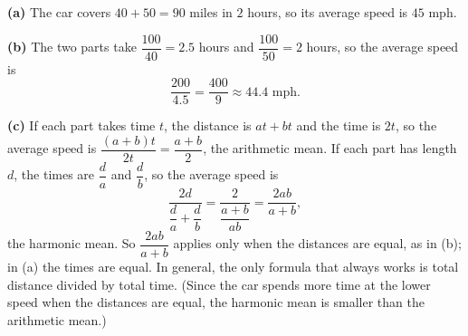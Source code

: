 \textbf{(a)} The car covers $40+50=90$ miles in $2$ hours, so its average speed is $\boxed{45}$ mph.

\textbf{(b)} The two parts take $\dfrac{100}{40}=2.5$ hours and $\dfrac{100}{50}=2$ hours, so the average speed is
\[\dfrac{200}{4.5}=\boxed{\dfrac{400}{9}}\approx44.4\text{ mph}.\]

\textbf{(c)} If each part takes time $t$, the distance is $at+bt$ and the time is $2t$, so the average speed is $\dfrac{(a+b)t}{2t}=\dfrac{a+b}{2}$, the arithmetic mean. If each part has length $d$, the times are $\dfrac {d}{a}$ and $\dfrac {d}{b}$, so the average speed is
\[\dfrac{2d}{\dfrac {d}{a}+\dfrac {d}{b}}=\dfrac{2}{\dfrac{a+b}{ab}}=\dfrac{2ab}{a+b},\]
the harmonic mean. So $\dfrac{2ab}{a+b}$ applies only when the distances are equal, as in (b); in (a) the times are equal. In general, the only formula that always works is total distance divided by total time. (Since the car spends more time at the lower speed when the distances are equal, the harmonic mean is smaller than the arithmetic mean.)

